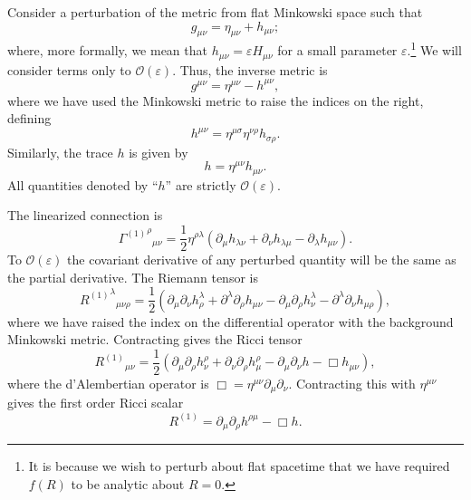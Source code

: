 \documentclass[aps,prd,amsfonts,amssymb,amsmath,nofootinbib,reprint,showpacs]{revtex4-1}
\newcommand{\order}[1]{\ensuremath{\mathcal{O}({#1})}}
\begin{document}
Consider a perturbation of the metric from flat Minkowski space such that
\begin{equation}
g_{\mu\nu} = \eta_{\mu\nu} + h_{\mu\nu};
\end{equation}
where, more formally, we mean that $h_{\mu\nu} = \varepsilon H_{\mu\nu}$ for a small parameter $\varepsilon$.\footnote{It is because we wish to perturb about flat spacetime that we have required $f(R)$ to be analytic about $R = 0$.} We will consider terms only to $\order{\varepsilon}$. Thus, the inverse metric is
\begin{equation}
g^{\mu\nu} = \eta^{\mu\nu} - h^{\mu\nu},
\end{equation}
where we have used the Minkowski metric to raise the indices on the right, defining
\begin{equation}
h^{\mu\nu} = \eta^{\mu\sigma}\eta^{\nu\rho}h_{\sigma\rho}.
\end{equation}
Similarly, the trace $h$ is given by
\begin{equation}
h = \eta^{\mu\nu}h_{\mu\nu}.
\end{equation}
All quantities denoted by ``$h$'' are strictly $\order{\varepsilon}$.

The linearized connection is
\begin{equation}
{{\Gamma^{(1)}}^\rho}_{\mu\nu} = \frac{1}{2}\eta^{\rho\lambda}(\partial_\mu h_{\lambda\nu} + \partial_\nu h_{\lambda\mu} - \partial_\lambda h_{\mu\nu}).
\label{eq:Lin_Gamma}
\end{equation}
To $\order{\varepsilon}$ the covariant derivative of any perturbed quantity will be the same as the partial derivative. The Riemann tensor is
\begin{equation}
{{R^{(1)}}^\lambda}_{\mu\nu\rho} = \frac{1}{2}(\partial_\mu\partial_\nu h^\lambda_\rho + \partial^\lambda\partial_\rho h_{\mu\nu} - \partial_\mu\partial_\rho h^\lambda_\nu - \partial^\lambda\partial_\nu h_{\mu\rho}),
\label{eq:Lin_Riemann}
\end{equation}
where we have raised the index on the differential operator with the background Minkowski metric. Contracting gives the Ricci tensor
\begin{equation}
{R^{(1)}}_{\mu\nu} = \frac{1}{2}(\partial_\mu\partial_\rho h^\rho_\nu + \partial_\nu\partial_\rho h^\rho_\mu - \partial_\mu\partial_\nu h - \Box h_{\mu\nu}),
\label{eq:Ricci}
\end{equation}
where the d'Alembertian operator is $\Box = \eta^{\mu\nu}\partial_\mu\partial_\nu$. Contracting this with $\eta^{\mu\nu}$ gives the first order Ricci scalar
\begin{equation}
R^{(1)} = \partial_\mu\partial_\rho h^{\rho\mu} - \Box h.
\label{eq:Scalar}
\end{equation}
\end{document}
